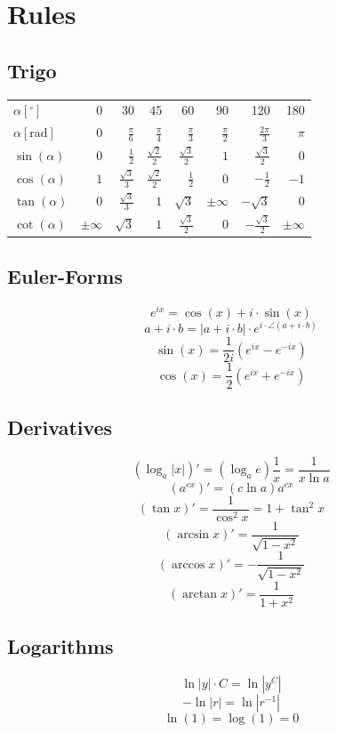 \documentclass[a4paper,12 pt]{article}
\numberwithin{equation}{section}
\theoremstyle{definition}
\theoremstyle{remark}
\theoremstyle{definition}
\theoremstyle{definition}
\theoremstyle{definition}
\theoremstyle{remark}
\begin{document}
\newpage
\section{Rules}
\subsection{Trigo}
\begin{center}
\begin{tabular}{lrrrrrrr}
\toprule
\vspace{0.1cm}$\alpha [^\circ]$ & 0 & 30 & 45 & 60 & 90 & 120 & 180 \\ 
$\alpha [\text{rad}]$ & 0 & $\frac{\pi}{6}$ & $\frac{\pi}{4}$ & $\frac{\pi}{3}$ & $\frac{\pi}{2}$ & $\frac{2\pi}{3}$ & $\pi$ \\
\midrule
\vspace{0.1cm}$\sin(\alpha)$ & $0$ & $\frac{1}{2}$ & $\frac{\sqrt{2}}{2}$ & $\frac{\sqrt{3}}{2}$ & $1$ & $\frac{\sqrt{3}}{2}$ & $0$ \\
\vspace{0.1cm}$\cos(\alpha)$ & $1$ & $\frac{\sqrt{3}}{3}$ & $\frac{\sqrt{2}}{2}$ & $\frac{1}{2}$ & $0$ & $-\frac{1}{2}$ & $-1$ \\
\vspace{0.1cm}$\tan(\alpha)$ & $0$ & $\frac{\sqrt{3}}{3}$ & $1$ & $\sqrt{3}$ & $\pm \infty$ & $-\sqrt{3}$ & $0$ \\
$\cot(\alpha)$ & $\pm \infty$ & $\sqrt{3}$ & $1$ & $\frac{\sqrt{3}}{2}$ & $0$ & $-\frac{\sqrt{3}}{2}$ & $\pm \infty$ \\
\bottomrule
\end{tabular}
\end{center}
\subsection{Euler-Forms}
\[ e^{ix}= \cos(x) + i \cdot \sin(x)\]
\[ a+i\cdot b = |a + i \cdot b|\cdot e^{i\cdot\angle(a+i\cdot b)}\]
\[\sin(x)=\frac{1}{2i}(e^{ix}-e^{-ix})\]
\[\cos(x)=\frac{1}{2}(e^{ix}+e^{-ix})\]
\subsection{Derivatives}
\[(\log_a |x|)'=(\log_a e)\frac{1}{x}=\frac{1}{x\ln a}\]		%
\[(a^{cx})'=(c\ln a)a^{cx}\]
\[(\tan x)'=\frac{1}{\cos^2 x}=1+\tan^2 x\]
\[(\arcsin x)'=\frac{1}{\sqrt{1-x^2}}\]
\[(\arccos x)'=-\frac{1}{\sqrt{1-x^2}}\]
\[(\arctan x)'=\frac{1}{1+x^2}\]
\subsection{Logarithms}
 \[ \ln |y|\cdot C = \ln |y^C|\]
 \[ - \ln |r| = \ln|r^{-1}|\]
 \[ \ln(1) = \log(1) = 0\]
\end{document}
